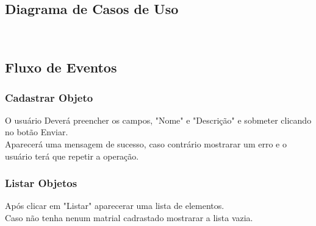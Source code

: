 \documentclass[a4paper]{article}
\begin{document}
    
    
    \subsection{Diagrama de Casos de Uso}

    \\


 \subsection{Fluxo de Eventos}
    \subsubsection{Cadastrar Objeto}
      O usuário Deverá preencher os campos, "Nome" e "Descrição" e sobmeter clicando no botão Enviar.\\
      Aparecerá uma mensagem de sucesso, caso contrário mostrarar um erro e o usuário terá que repetir a operação.\\

      \subsubsection{Listar Objetos}
    Após clicar em "Listar" aparecerar uma lista de elementos.\\
    Caso não tenha nenum matrial cadrastado mostrarar a lista vazia.\\
    
\end{document}
